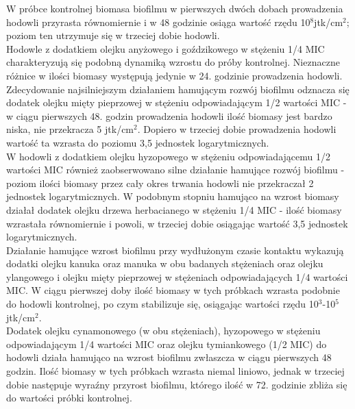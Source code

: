 \documentclass[11pt,a4paper]{report}
\begin{document}
W próbce kontrolnej biomasa biofilmu w pierwszych dwóch dobach prowadzenia hodowli przyrasta równomiernie i w 48 godzinie osiąga wartość rzędu 10$^8$jtk/cm$^2$; poziom ten utrzymuje się w trzeciej dobie hodowli.\\
Hodowle z dodatkiem olejku anyżowego i goździkowego w stężeniu 1/4 MIC charakteryzują się podobną dynamiką wzrostu do próby kontrolnej. Nieznaczne różnice w ilości biomasy występują jedynie w 24. godzinie prowadzenia hodowli.\\
Zdecydowanie najsilniejszym działaniem hamującym rozwój biofilmu odznacza się dodatek olejku mięty pieprzowej w stężeniu odpowiadającym 1/2 wartości MIC - w ciągu pierwszych 48. godzin prowadzenia hodowli ilość biomasy jest bardzo niska, nie przekracza 5 jtk/cm$^2$. Dopiero w trzeciej dobie prowadzenia hodowli wartość ta wzrasta do poziomu 3,5 jednostek logarytmicznych.\\
W hodowli z dodatkiem olejku hyzopowego w stężeniu odpowiadającemu 1/2 wartości MIC również zaobserwowano silne działanie hamujące rozwój biofilmu - poziom ilości biomasy przez cały okres trwania hodowli nie przekraczał 2 jednostek logarytmicznych. W podobnym stopniu hamująco na wzrost biomasy działał dodatek olejku drzewa herbacianego w stężeniu 1/4 MIC - ilość biomasy wzrastała równomiernie i powoli, w trzeciej dobie osiągając wartość 3,5 jednostek logarytmicznych.\\
Działanie hamujące  wzrost biofilmu przy wydłużonym czasie kontaktu wykazują dodatki olejku kanuka oraz manuka w obu badanych stężeniach oraz olejku ylangowego i olejku mięty pieprzowej w stężeniach odpowiadających 1/4 wartości MIC. W ciągu pierwszej doby ilość biomasy w tych próbkach wzrasta podobnie do hodowli kontrolnej, po czym stabilizuje się, osiągając wartości rzędu 10$^3$-10$^5$jtk/cm$^2$.\\
Dodatek olejku cynamonowego (w obu stężeniach), hyzopowego w stężeniu odpowiadającym 1/4 wartości MIC oraz olejku tymiankowego (1/2 MIC) do hodowli działa hamująco na wzrost biofilmu zwłaszcza w ciągu pierwszych 48 godzin. Ilość biomasy w tych próbkach wzrasta niemal liniowo, jednak w trzeciej dobie następuje wyraźny przyrost biofilmu, którego ilość w 72. godzinie zbliża się do wartości próbki kontrolnej.
\end{document}
